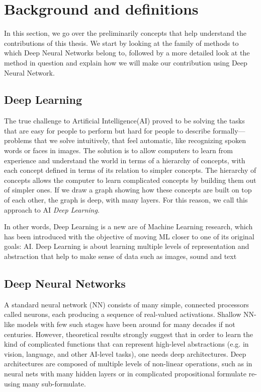 \chapter{Background and definitions}
\label{sec:Background}
In this section, we go over the preliminarily concepts that help understand the contributions of this thesis. We start by looking at the family of methods to which Deep Neural Networks belong to, followed by a more detailed look at the method in question and explain how we will make our contribution using Deep Neural Network. 

\section{Deep Learning}

The true challenge to Artificial Intelligence(AI) proved to be solving the tasks that are easy for people to perform but hard for people to describe formally—problems that we solve intuitively, that feel automatic, like recognizing spoken words or faces in images. The solution is to allow computers to learn from experience and understand the world in terms of a hierarchy of concepts, with each concept defined in terms of its relation to simpler concepts. The hierarchy of concepts allows the computer to learn complicated concepts by building them out of simpler ones. If we draw a graph showing how these concepts are built on top of each other, the graph is deep, with many layers. For this reason, we call this approach to AI \textit{Deep Learning}\cite{dl book}.

In other words,  Deep Learning is a new are of Machine Learning research, which has been introduced with the objective of moving ML closer to one of its original goals: AI. Deep Learning is about learning multiple levels of representation and abstraction that help to make sense of data such as images, sound and text\cite{dldef2} 

\section{Deep Neural Networks}


A standard neural network (NN) consists of many simple, connected processors called neurons, each producing a sequence of real-valued activations. Shallow NN-like models with few such stages have been around for many decades if not centuries\cite{deepnn}. However, theoretical results strongly suggest that in order to learn the kind of complicated functions that can represent high-level abstractions (e.g. in vision, language, and other AI-level tasks), one needs deep architectures. Deep architectures are composed of multiple levels of non-linear operations, such as in neural nets with many hidden layers or in complicated propositional formulate re-using many sub-formulate\cite{dl for ai}.




